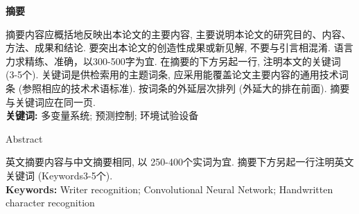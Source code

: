 \setcounter{page}{1}
\begin{center}
\bfseries
 摘\quad 要
\end{center}
\thispagestyle{plain}
\begin{spacing}{1.5}
摘要内容应概括地反映出本论文的主要内容, 主要说明本论文的研究目的、内容、方法、成果和结论. 要突出本论文的创造性成果或新见解, 不要与引言相混淆. 语言力求精练、准确，以300-500字为宜. 在摘要的下方另起一行, 注明本文的关键词 (3-5个). 关键词是供检索用的主题词条, 应采用能覆盖论文主要内容的通用技术词条 (参照相应的技术术语标准). 按词条的外延层次排列 (外延大的排在前面). 摘要与关键词应在同一页.
\ \\
\textbf{关键词: }多变量系统; 预测控制; 环境试验设备
\end{spacing}
\pagebreak[4]
\thispagestyle{plain}

\begin{center}
Abstract
\end{center}
\begin{spacing}{1.5}
英文摘要内容与中文摘要相同, 以 250-400个实词为宜. 摘要下方另起一行注明英文关键词 (Keywords3-5个).
\ \\
\textbf{Keywords: }Writer recognition; Convolutional Neural Network; Handwritten character recognition
\end{spacing}
\pagebreak[4]
